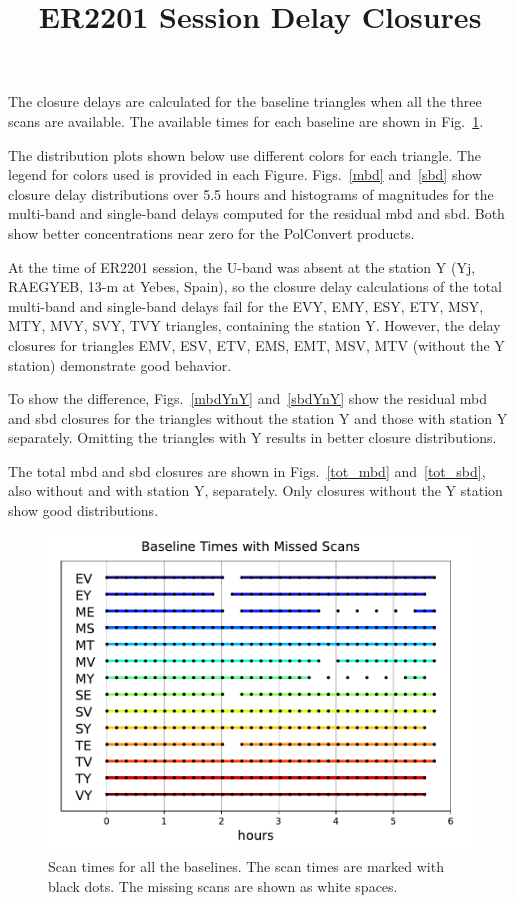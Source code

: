 \documentclass[letterpaper,twoside,12pt]{article}
\title{ER2201 Session Delay Closures}
\begin{document}
\maketitle

The closure delays are calculated for the baseline triangles when all the three scans are available. The available times for each baseline are shown in Fig.~\ref{time_gaps}.

The distribution plots shown below use different colors for each triangle. The legend for colors used is provided in each Figure. Figs.~\ref{mbd} and~\ref{sbd} show closure delay distributions over 5.5 hours and histograms of magnitudes for the multi-band and single-band delays computed for the residual mbd and sbd. Both show better concentrations near zero for the PolConvert products.

At the time of ER2201 session, the U-band was absent at the station Y (Yj, RAEGYEB, 13-m at Yebes, Spain), so the closure delay calculations of the total multi-band and single-band delays fail for the EVY, EMY, ESY, ETY, MSY, MTY, MVY, SVY, TVY triangles, containing the station Y. However, the delay closures for triangles EMV, ESV, ETV, EMS, EMT, MSV, MTV (without the Y station) demonstrate good behavior. 

To show the difference, Figs.~\ref{mbdYnY} and~\ref{sbdYnY} show the residual mbd and sbd closures for the triangles without the station Y and those with station Y separately. Omitting the triangles with Y results in better closure distributions. 

The total mbd and sbd closures are shown in Figs.~\ref{tot_mbd} and~\ref{tot_sbd}, also without and with station Y, separately. Only closures without the Y station show good distributions.  




\begin{figure}[h!]
  \centering
  \includegraphics[width=30pc]{Gaps_in_Time.pdf}
  \caption{\small Scan times for all the baselines. The scan times are marked with black dots. The missing scans are shown as white spaces. }
  \label{time_gaps}
\end{figure}
\end{document}
